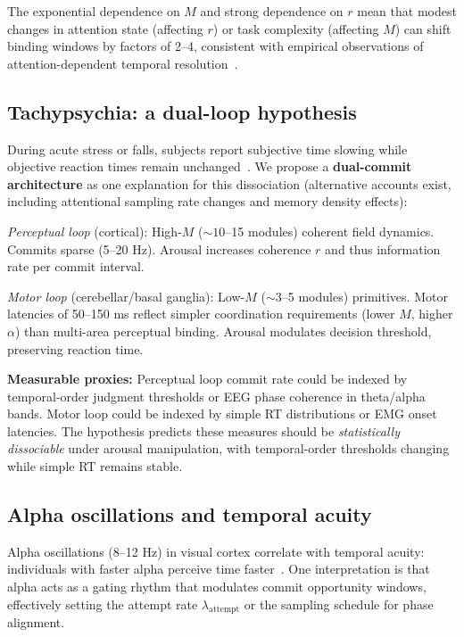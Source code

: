 \documentclass[12pt]{article}
\begin{document}
The exponential dependence on $M$ and strong dependence on $r$ mean that modest changes in attention state (affecting $r$) or task complexity (affecting $M$) can shift binding windows by factors of 2--4, consistent with empirical observations of attention-dependent temporal resolution~\cite{samaha2015}.

\subsection{Tachypsychia: a dual-loop hypothesis}

During acute stress or falls, subjects report subjective time slowing while objective reaction times remain unchanged~\cite{stetson2007}. We propose a \textbf{dual-commit architecture} as one explanation for this dissociation (alternative accounts exist, including attentional sampling rate changes and memory density effects):

\emph{Perceptual loop} (cortical): High-$M$ ($\sim 10$--15 modules) coherent field dynamics. Commits sparse (5--20 Hz). Arousal increases coherence $r$ and thus information rate per commit interval.

\emph{Motor loop} (cerebellar/basal ganglia): Low-$M$ ($\sim 3$--5 modules) primitives. Motor latencies of 50--150 ms reflect simpler coordination requirements (lower $M$, higher $\alpha$) than multi-area perceptual binding. Arousal modulates decision threshold, preserving reaction time.

\textbf{Measurable proxies:} Perceptual loop commit rate could be indexed by temporal-order judgment thresholds or EEG phase coherence in theta/alpha bands. Motor loop could be indexed by simple RT distributions or EMG onset latencies. The hypothesis predicts these measures should be \emph{statistically dissociable} under arousal manipulation, with temporal-order thresholds changing while simple RT remains stable.

\subsection{Alpha oscillations and temporal acuity}

Alpha oscillations (8--12 Hz) in visual cortex correlate with temporal acuity: individuals with faster alpha perceive time faster~\cite{samaha2015,cecere2015}. One interpretation is that alpha acts as a gating rhythm that modulates commit opportunity windows, effectively setting the attempt rate $\lambda_{\mathrm{attempt}}$ or the sampling schedule for phase alignment.
\end{document}
